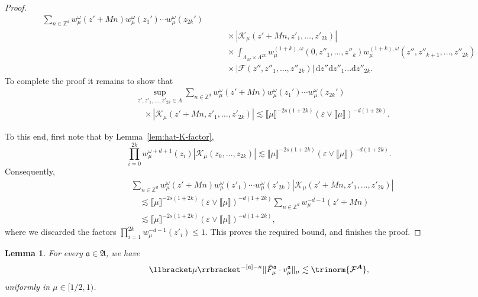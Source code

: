 \documentclass{article}
\numberwithin{equation}{section}
\newcommand{\mathd}{\mathrm{d}}
\theoremstyle{plain}
\newtheorem{lemma}[theorem]{Lemma}
\theoremstyle{definition}
\begin{document}
\begin{proof}
\begin{align*}
       \sum_{n \in \mathbb{Z}^d} w^{\omega}_{\mu} (z' + M n)
       w^{\omega}_{\mu} (z_1') \cdots w^{\omega}_{\mu} (z_{2 k}')\\
       &\qquad \times
       | \mathcal{K}_{\mu} (z' + M n, z'_1, \ldots, z'_{2 k}) |\\
       &\qquad \times \int_{\Lambda_M \times \Lambda^{2 k}}
       w^{(1 + k), \omega}_{\mu}
       (0, z''_1, \ldots, z''_k) w^{(1 + k), \omega}_{\mu}
       (z'', z''_{k + 1}, \ldots, z''_{2 k})\\
       &\qquad \times
       | \mathcal{F} (z'', z''_1, \ldots, z''_{2 k}) |\,
       \mathd z'' \mathd z''_1 \ldots \mathd z''_{2 k} .
  \end{align*}
  To complete the proof it remains to show that
  \begin{align*}
    &\sup_{z', z'_1, \ldots, z'_{2 k} \in \Lambda}
    \sum_{n \in \mathbb{Z}^d}
    w^{\omega}_{\mu} (z' + M n) w^{\omega}_{\mu} (z_1') \cdots
    w^{\omega}_{\mu} (z_{2 k}')\\
    &\quad \times
    | \mathcal{K}_{\mu} (z' + M n, z'_1, \ldots, z'_{2 k}) |
    \lesssim \llbracket \mu \rrbracket^{- 2 s (1 + 2 k)}
    (\varepsilon \vee \llbracket \mu \rrbracket)^{- d (1 + 2 k)}.
  \end{align*}
  
  To this end, first note that by Lemma~\ref{lem:hat-K-factor},
  \[
  \prod_{i=0}^{2k}w_\mu^{\omega+d+1}(z_i)
  \left|\mathcal K_\mu(z_0,\ldots,z_{2k})\right|
  \lesssim
  \llbracket \mu \rrbracket^{-2s(1+2k)}
  (\varepsilon\vee\llbracket \mu \rrbracket)^{-d(1+2k)}.
  \]
  Consequently,
  \begin{align*}
  	&\sum_{n\in\mathbb Z^d}
  	w_\mu^\omega(z'+Mn)
  	w_\mu^\omega(z'_1)\cdots w_\mu^\omega(z'_{2k})
  	\left|\mathcal K_\mu(z'+Mn,z'_1,\ldots,z'_{2k})\right|
  	\\
  	&\quad\lesssim
  	\llbracket \mu \rrbracket^{-2s(1+2k)}
  	(\varepsilon\vee\llbracket \mu \rrbracket)^{-d(1+2k)}
  	\sum_{n\in\mathbb Z^d}w_\mu^{-d-1}(z'+Mn)
  	\\
  	&\quad\lesssim
  	\llbracket \mu \rrbracket^{-2s(1+2k)}
  	(\varepsilon\vee\llbracket \mu \rrbracket)^{-d(1+2k)},
  \end{align*}
  where we discarded the factors
  \(\prod_{i=1}^{2k}w_\mu^{-d-1}(z'_i)\leq1\).
  This proves the required bound, and finishes the proof.  
\end{proof}

\begin{lemma}
  \label{lem:control-of-avgs} For every \(\mathfrak a\in\mathfrak A\), we have
  \[ \llbracket \mu \rrbracket^{- [\mathfrak{a}] - \kappa}  \| 
     \bar{F}^{\mathfrak{a}}_{\mu} \cdot v^{\mathfrak{a}}_{\mu} \|_{\mu}
     \lesssim \trinorm{ {\mathcal{F}^{\boldsymbol{A}}} 
     }, \]
  uniformly in $\mu \in [1 / 2, 1)$.
\end{lemma}
\end{document}

